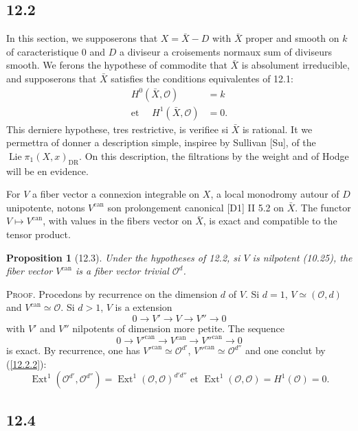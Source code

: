 \documentclass[12pt,a4paper]{article}
\theoremstyle{plain}
\newtheorem{proposition}[theorem]{Proposition}
\theoremstyle{definition}
\theoremstyle{remark}
\DeclareMathOperator{\Lie}{Lie}
\DeclareMathOperator{\Ext}{Ext}
\newcommand{\DR}{\mathrm{DR}}
\newcommand{\can}{\mathrm{can}}
\begin{document}
\subsection*{12.2}

In this section, we supposerons that $X = \bar{X} - D$ with $\bar{X}$ proper and smooth on $k$ of caracteristique 0 and $D$ a diviseur a croisements normaux sum of diviseurs smooth. We ferons the hypothese of commodite that $\bar{X}$ is absolument irreducible, and supposerons that $\bar{X}$ satisfies the conditions equivalentes of 12.1:
\begin{align}
H^0(\bar{X}, \mathcal{O}) &= k \label{12.2.1} \\
\text{et } \quad H^1(\bar{X}, \mathcal{O}) &= 0. \label{12.2.2}
\end{align}
This derniere hypothese, tres restrictive, is verifiee si $\bar{X}$ is rational. It we permettra of donner a description simple, inspiree by Sullivan [Su], of the $\Lie \pi_1(X, x)_{\DR}$. On this description, the filtrations by the weight and of Hodge will be en evidence.

For $V$ a fiber vector a connexion integrable on $X$, a local monodromy autour of $D$ unipotente, notons $V^{\can}$ son prolongement canonical [D1] II 5.2 on $\bar{X}$. The functor $V \mapsto V^{\can}$, with values in the fibers vector on $\bar{X}$, is exact and compatible to the tensor product.

\begin{proposition}[12.3]
Under the hypotheses of 12.2, si $V$ is nilpotent (10.25), the fiber vector $V^{\can}$ is a fiber vector trivial $\mathcal{O}^d$.
\end{proposition}

\textsc{Proof.} Procedons by recurrence on the dimension $d$ of $V$. Si $d = 1$, $V \simeq (\mathcal{O}, d)$ and $V^{\can} \simeq \mathcal{O}$. Si $d > 1$, $V$ is a extension
$$0 \longrightarrow V' \longrightarrow V \longrightarrow V'' \longrightarrow 0$$
with $V'$ and $V''$ nilpotents of dimension more petite. The sequence
$$0 \longrightarrow V'^{\can} \longrightarrow V^{\can} \longrightarrow V''^{\can} \longrightarrow 0$$
is exact. By recurrence, one has $V'^{\can} \simeq \mathcal{O}^{d'}$, $V''^{\can} \simeq \mathcal{O}^{d''}$ and one conclut by (\ref{12.2.2}):
$$\Ext^1(\mathcal{O}^{d'}, \mathcal{O}^{d''}) = \Ext^1(\mathcal{O}, \mathcal{O})^{d'd''} \text{ et } \Ext^1(\mathcal{O}, \mathcal{O}) = H^1(\mathcal{O}) = 0.$$

\subsection*{12.4}
\end{document}
